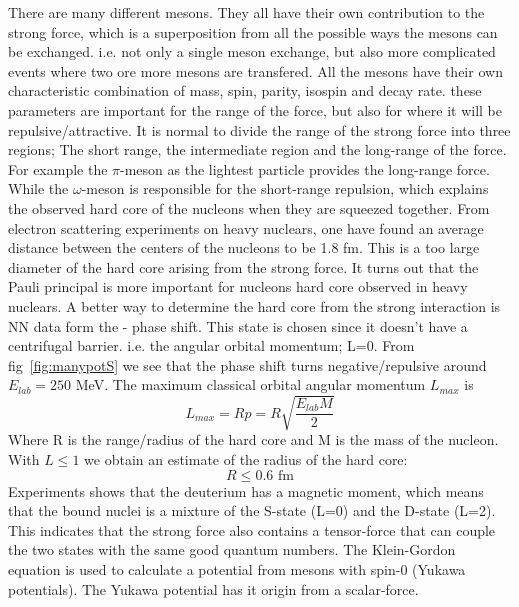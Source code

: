 There are many different mesons. They all have their own contribution to the strong force,
which is a superposition from all the possible ways the mesons can be exchanged. 
i.e. not only a single meson exchange, but also more complicated events where two ore more mesons are transfered.
All the mesons have their own characteristic combination of mass, spin, parity, isospin and decay rate. 
these parameters are important for the range of the force, but also for where it will be repulsive/attractive.
It is normal to divide the range of the strong force into three regions; 
The short range, the intermediate region and the long-range of the force.
For example the $\pi$-meson as the lightest particle provides the long-range force. 
While the $\omega$-meson is responsible for the short-range repulsion, which explains the observed hard core of
the nucleons when they are squeezed together. From electron scattering experiments on heavy nuclears,
one have found an average distance between the centers of the nucleons to be 1.8 fm. 
This is a too large diameter of the hard core arising from the strong force. It turns out that the Pauli 
principal is more important for nucleons hard core observed in heavy nuclears. 
A better way to determine the hard core from the strong interaction is NN data form the - phase shift.
This state is chosen since it doesn't have a centrifugal barrier. i.e. the angular orbital momentum; L=0. 
From fig~\ref{fig:manypotS} we see that the phase shift turns negative/repulsive around $E_{lab}=250$ MeV.
The maximum classical orbital angular momentum $L_{max}$ is
\begin{equation}\label{eq:Lmax}
L_{max}=Rp=R\sqrt{\frac{E_{lab}M}{2}}
\end{equation}
Where R is the range/radius of the hard core and M is the mass of the nucleon.
With $L\le1$ we obtain an estimate of the radius of the hard core: 
\begin{equation}\label{eq:Lmax2}
R\le 0.6 \text{ fm}
\end{equation}
Experiments shows that the deuterium has a magnetic moment, which means that the bound nuclei is a mixture
of the S-state (L=0) and the D-state (L=2). This indicates that the strong force also contains a tensor-force
that can couple the two states with the same good quantum numbers. 
The Klein-Gordon equation is used to calculate a potential from mesons with spin-$0$ (Yukawa potentials).
The Yukawa potential has it origin from a scalar-force.
